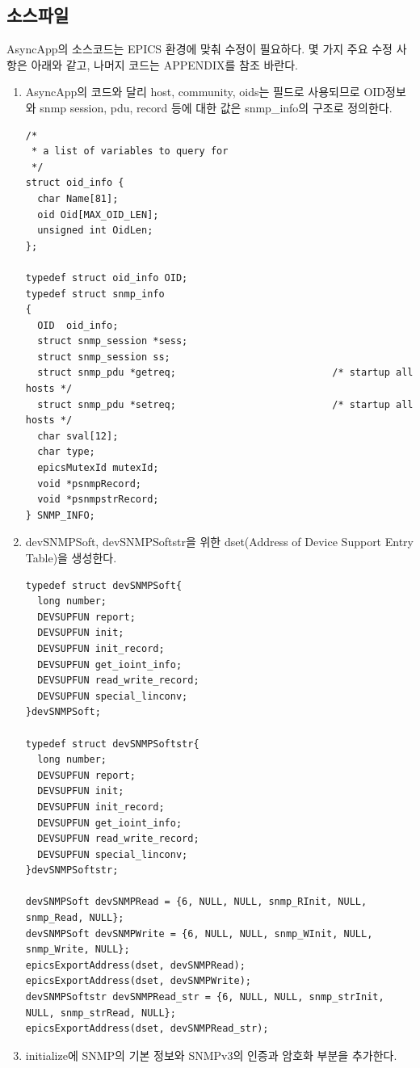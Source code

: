 \documentclass[11pt
  , a4paper
  , article
  , oneside
]{memoir}
\begin{document}
\subsection{소스파일}
AsyncApp의 소스코드는 EPICS 환경에 맞춰 수정이 필요하다. 몇 가지 주요 수정 사항은 아래와 같고, 나머지 코드는 APPENDIX를 참조 바란다.
\begin{enumerate}
\item AsyncApp의 코드와 달리 host, community, oids는 필드로 사용되므로 OID정보와 snmp session, pdu, record 등에 대한 값은 snmp\_info의 구조로 정의한다.

\begin{lstlisting}[style=termstyle]
/*
 * a list of variables to query for
 */
struct oid_info {
  char Name[81];
  oid Oid[MAX_OID_LEN];
  unsigned int OidLen;
};

typedef struct oid_info OID;
typedef struct snmp_info
{
  OID  oid_info;
  struct snmp_session *sess;
  struct snmp_session ss;
  struct snmp_pdu *getreq;                           /* startup all hosts */
  struct snmp_pdu *setreq;                           /* startup all hosts */
  char sval[12];
  char type;
  epicsMutexId mutexId;
  void *psnmpRecord;
  void *psnmpstrRecord;
} SNMP_INFO;
\end{lstlisting}

\item devSNMPSoft, devSNMPSoftstr을 위한 dset(Address of Device Support Entry Table)을 생성한다.

\begin{lstlisting}[style=termstyle]
typedef struct devSNMPSoft{
  long number;
  DEVSUPFUN report;
  DEVSUPFUN init;
  DEVSUPFUN init_record;
  DEVSUPFUN get_ioint_info;
  DEVSUPFUN read_write_record;
  DEVSUPFUN special_linconv;
}devSNMPSoft;

typedef struct devSNMPSoftstr{
  long number;
  DEVSUPFUN report;
  DEVSUPFUN init;
  DEVSUPFUN init_record;
  DEVSUPFUN get_ioint_info;
  DEVSUPFUN read_write_record;
  DEVSUPFUN special_linconv;
}devSNMPSoftstr;

devSNMPSoft devSNMPRead = {6, NULL, NULL, snmp_RInit, NULL, snmp_Read, NULL};
devSNMPSoft devSNMPWrite = {6, NULL, NULL, snmp_WInit, NULL, snmp_Write, NULL};
epicsExportAddress(dset, devSNMPRead);
epicsExportAddress(dset, devSNMPWrite);
devSNMPSoftstr devSNMPRead_str = {6, NULL, NULL, snmp_strInit, NULL, snmp_strRead, NULL};
epicsExportAddress(dset, devSNMPRead_str);
\end{lstlisting}

\item initialize에 SNMP의 기본 정보와 SNMPv3의 인증과 암호화 부분을 추가한다. 


\end{enumerate}
\end{document}
